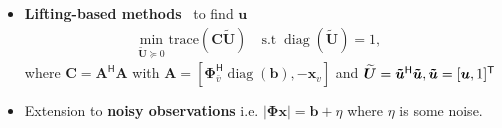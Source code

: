 \documentclass[25pt,a0paper]{tikzposter}
\newcommand{\vct}[1]{\bm{#1}} %
\newcommand{\mtx}[1]{\bm{#1}} %
\DeclareMathOperator*{\diag}{diag}
\begin{document}
\begin{columns}
{\begin{itemize}
    \item \textbf{Lifting-based methods}~\cite{Candes2011} to find $\vct{u}$
        \begin{align*}
            \underset{\mtx{\widetilde{U}} \succeq 0}{\text{min}} \;
            {\text{trace}(\mtx{C}\mtx{\widetilde{U}})} \quad 
             \text{s.t} \;  \diag(\mtx{\widetilde{U}})=1,
            \end{align*}
            where $\mtx{C} = \mtx{A^{\mathsf{H}}}\mtx{A}$  with  $\mtx{A} =[\mtx{\Phi}_{\bar{v}}^{\mathsf{H}}\diag(\vct{b}), -\vct{x}_{v}]$ and $\mtx{\widetilde{U}} = \vct{\Tilde{u}}^{\mathsf{H}}\vct{\Tilde{u}}, \vct{\Tilde{u}} = [\vct{u},1]^{\mathsf{T}}$
    \item Extension to \textbf{noisy observations} i.e.  $|\mtx{\Phi} \vct{x} | = \vct{b} + \eta$ where $\eta$ is some noise. 
\end{itemize}
\vspace{-2cm}
}
\end{columns}

\begin{columns}
\end{columns}
\end{document}
